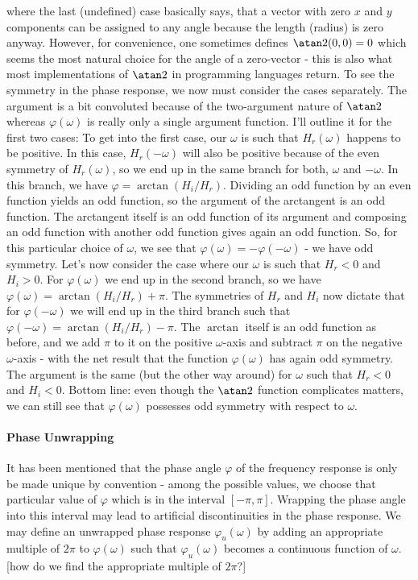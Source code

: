 where the last (undefined) case basically says, that a vector with zero $x$ and $y$ components can be assigned to any angle because the length (radius) is zero anyway. However, for convenience, one sometimes defines $\atan2(0, 0) = 0$ which seems the most natural choice for the angle of a zero-vector - this is also what most implementations of $\atan2$ in programming languages return. To see the symmetry in the phase response, we now must consider the cases separately. The argument is a bit convoluted because of the two-argument nature of $\atan2$ whereas $\varphi(\omega)$ is really only a single argument function. I'll outline it for the first two cases: To get into the first case, our $\omega$ is such that $H_r(\omega)$ happens to be positive. In this case, $H_r(-\omega)$ will also be positive because of the even symmetry of $H_r(\omega)$, so we end up in the same branch for both, $\omega$ and $-\omega$. In this branch, we have $\varphi = \arctan(H_i/H_r)$. Dividing an odd function by an even function yields an odd function, so the argument of the arctangent is an odd function. The arctangent itself is an odd function of its argument and composing an odd function with another odd function gives again an odd function. So, for this particular choice of $\omega$, we see that $\varphi(\omega) = -\varphi(-\omega)$ - we have odd symmetry. Let's now consider the case where our $\omega$ is such that $H_r < 0$ and $H_i > 0$. For $\varphi(\omega)$ we end up in the second branch, so we have $\varphi(\omega) = \arctan(H_i/H_r) + \pi$. The symmetries of $H_r$ and $H_i$ now dictate that for $\varphi(-\omega)$ we will end up in the third branch such that $\varphi(-\omega) = \arctan(H_i/H_r) - \pi$. The $\arctan$ itself is an odd function as before, and we add $\pi$ to it on the positive $\omega$-axis and subtract $\pi$ on the negative $\omega$-axis - with the net result that the function $\varphi(\omega)$ has again odd symmetry. The argument is the same (but the other way around) for $\omega$ such that $H_r < 0$ and $H_i < 0$. Bottom line: even though the $\atan2$ function complicates matters, we can still see that $\varphi(\omega)$ possesses odd symmetry with respect to $\omega$.

\paragraph{Phase Unwrapping}
It has been mentioned that the phase angle $\varphi$ of the frequency response is only be made unique by convention - among the possible values, we choose that particular value of $\varphi$ which is in the interval $[-\pi, \pi]$. Wrapping the phase angle into this interval may lead to artificial discontinuities in the phase response. We may define an unwrapped phase response $\varphi_u(\omega)$ by adding an appropriate multiple of $2 \pi$ to $\varphi(\omega)$ such that $\varphi_u(\omega)$ becomes a continuous function of $\omega$. [how do we find the appropriate multiple of $2\pi$?]


